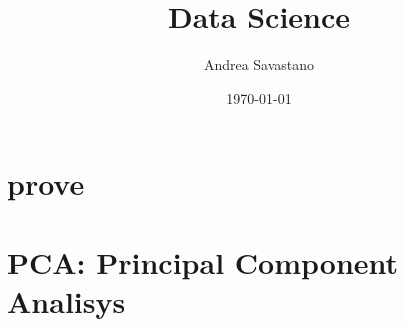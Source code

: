 \documentclass[a4paper,11pt]{article}
\title{\Huge Data Science}
\author{Andrea Savastano}
\date{\today}
\begin{document}
	\maketitle
	
	\newpage
	\tableofcontents
	
	\newpage
	\section{prove}
	
	
	\newpage
	\section{PCA: Principal Component Analisys}
	
	
	\newpage
	\listoffigures
	
\end{document}
